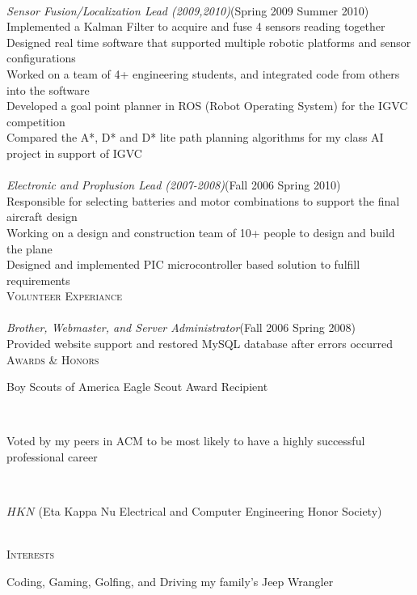 \documentclass[10pt,letter,oneside]{article}
\newcommand{\SectionHeader}[1]{\textsc{#1} \vspace{-2px}\\}
\newcommand{\CompanyHeader}[4]{\hspace*{.52in}{\bf#1} \hfill #2 \\\hspace*{.5in}\emph{#3}\hfill (#4) \\}
\newcommand{\ResumeItem}[1]{\hspace*{.5in}\textopenbullet\hspace*{.2in}#1\\}
\newcommand{\TextBlock}[1]
{\hspace*{.5in} \begin{minipage}[t]{7in} #1 \end{minipage}\\}
\begin{document}
\CompanyHeader{Intelligent Ground Vehicle Competition (IGVC)}{}{Sensor Fusion/Localization Lead (2009,2010)}{Spring 2009 \textendash { }Summer 2010}
 \ResumeItem{Implemented a Kalman Filter to acquire and fuse 4 sensors reading together}
 \ResumeItem{Designed real time software that supported multiple robotic platforms and sensor configurations}
 \ResumeItem{Worked on a team of 4+ engineering students, and integrated code from others into the software}
 \ResumeItem{Developed a goal point planner in ROS (Robot Operating System) for the IGVC competition}
 \ResumeItem{Compared the A*, D* and D* lite path planning algorithms for my class AI project in support of IGVC}
 \CompanyHeader{Design Build Fly/DBF}{}{Electronic and Proplusion Lead (2007-2008)}{Fall 2006 \textendash { }Spring 2010}
 \ResumeItem{Responsible for selecting batteries and motor combinations to support the final aircraft design}
 \ResumeItem{Working on a design and construction team of 10+ people to design and build the plane}
\ResumeItem{Designed and implemented PIC microcontroller based solution to fulfill requirements}
\SectionHeader{Volunteer Experiance}
 \CompanyHeader{Alpha Phi Omega (National Service Fraternity)}{}{Brother, Webmaster, and Server Administrator}{Fall 2006 \textendash { }Spring 2008}
 \ResumeItem{Provided website support and restored MySQL database after errors occurred}
\SectionHeader{Awards \& Honors}
\TextBlock{Boy Scouts of America Eagle Scout Award Recipient}
\TextBlock{Voted by my peers in ACM to be most likely to have a highly successful professional career}
\TextBlock{$HKN$ (Eta Kappa Nu Electrical and Computer Engineering Honor Society)}
\SectionHeader{Interests}
\TextBlock{Coding, Gaming, Golfing, and Driving my family’s Jeep Wrangler}
\end{document}
